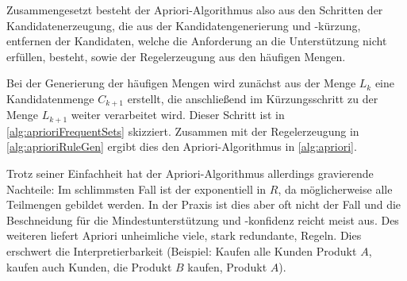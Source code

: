 		Zusammengesetzt besteht der Apriori-Algorithmus also aus den Schritten der Kandidatenerzeugung, die aus der Kandidatengenerierung und -kürzung, \dh entfernen der Kandidaten, welche die Anforderung an die Unterstützung nicht erfüllen, besteht, sowie der Regelerzeugung aus den häufigen Mengen.

		Bei der Generierung der häufigen Mengen wird zunächst aus der Menge \(L_k\) eine Kandidatenmenge \(C_{k + 1}\) erstellt, die anschließend im Kürzungsschritt zu der Menge \(L_{k + 1}\) weiter verarbeitet wird. Dieser Schritt ist in \autoref{alg:aprioriFrequentSets} skizziert. Zusammen mit der Regelerzeugung in \autoref{alg:aprioriRuleGen} ergibt dies den Apriori-Algorithmus in \autoref{alg:apriori}.

		Trotz seiner Einfachheit hat der Apriori-Algorithmus allerdings gravierende Nachteile: Im schlimmsten Fall ist der exponentiell in \(R\), da möglicherweise alle Teilmengen gebildet werden. In der Praxis ist dies aber oft nicht der Fall und die Beschneidung für die Mindestunterstützung und -konfidenz reicht meist aus. Des weiteren liefert Apriori unheimliche viele, stark redundante, Regeln. Dies erschwert die Interpretierbarkeit (Beispiel: Kaufen alle Kunden Produkt \(A\), kaufen auch Kunden, die Produkt \(B\) kaufen, Produkt \(A\)).

